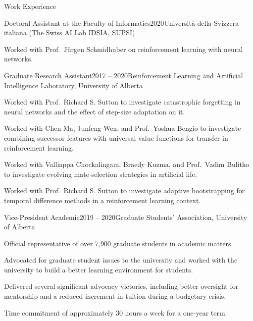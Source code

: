 \documentclass{cv}
\begin{document}
\begin{rSection}{Work Experience}

\begin{rSubsection}{Doctoral Assistant at the Faculty of Informatics}{2020}{Universit{\`{a}} della Svizzera italiana (The Swiss AI Lab IDSIA, SUPSI)}
\item Worked with Prof.~J{\"u}rgen Schmidhuber on reinforcement learning with neural networks.
\end{rSubsection}


\begin{rSubsection}{Graduate Research Assistant}{2017 -- 2020}{Reinforcement Learning and Artificial Intelligence Laboratory, University of Alberta}
\item Worked with Prof.~Richard S. Sutton to investigate catastrophic forgetting in neural networks and the effect of step-size adaptation on it.
\item Worked with Chen Ma, Junfeng Wen, and Prof.~Yoshua Bengio to investigate combining successor features with universal value functions for transfer in reinforcement learning.
\item Worked with Valliappa Chockalingam, Braedy Kuzma, and Prof.~Vadim Bulitko to investigate evolving mate-selection strategies in artificial life.
\item Worked with Prof.~Richard S. Sutton to investigate adaptive bootstrapping for temporal difference methods in a reinforcement learning context.
\end{rSubsection}


\begin{rSubsection}{Vice-President Academic}{2019 -- 2020}{Graduate Students' Association, University of Alberta}
\item Official representative of over 7,900 graduate students in academic matters.
\item Advocated for graduate student issues to the university and worked with the university to build a better learning environment for students.
\item Delivered several significant advocacy victories, including better oversight for mentorship and a reduced increment in tuition during a budgetary crisis.
\item Time commitment of approximately 30 hours a week for a one-year term.
\end{rSubsection}


\end{rSection}
\end{document}
